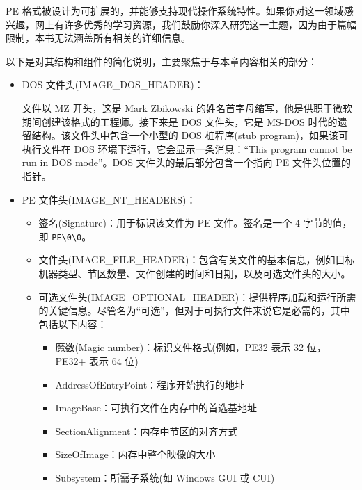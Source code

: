PE 格式被设计为可扩展的，并能够支持现代操作系统特性。如果你对这一领域感兴趣，网上有许多优秀的学习资源，我们鼓励你深入研究这一主题，因为由于篇幅限制，本书无法涵盖所有相关的详细信息。

以下是对其结构和组件的简化说明，主要聚焦于与本章内容相关的部分：

\begin{itemize}
\item 
DOS 文件头(IMAGE\_DOS\_HEADER)：

文件以 MZ 开头，这是 Mark Zbikowski 的姓名首字母缩写，他是供职于微软期间创建该格式的工程师。接下来是 DOS 文件头，它是 MS-DOS 时代的遗留结构。该文件头中包含一个小型的 DOS 桩程序(stub program)，如果该可执行文件在 DOS 环境下运行，它会显示一条消息：“This program cannot be run in DOS mode”。DOS 文件头的最后部分包含一个指向 PE 文件头位置的指针。

\item 
PE 文件头(IMAGE\_NT\_HEADERS)：

\begin{itemize}
\item 
签名(Signature)：用于标识该文件为 PE 文件。签名是一个 4 字节的值，即 \verb|PE\0\0|。

\item 
文件头(IMAGE\_FILE\_HEADER)：包含有关文件的基本信息，例如目标机器类型、节区数量、文件创建的时间和日期，以及可选文件头的大小。

\item 
可选文件头(IMAGE\_OPTIONAL\_HEADER)：提供程序加载和运行所需的关键信息。尽管名为“可选”，但对于可执行文件来说它是必需的，其中包括以下内容：

\begin{itemize}
\item 
魔数(Magic number)：标识文件格式(例如，PE32 表示 32 位，PE32+ 表示 64 位)

\item 
AddressOfEntryPoint：程序开始执行的地址

\item 
ImageBase：可执行文件在内存中的首选基地址

\item 
SectionAlignment：内存中节区的对齐方式

\item 
SizeOfImage：内存中整个映像的大小

\item 
Subsystem：所需子系统(如 Windows GUI 或 CUI)
\end{itemize}

\end{itemize}


\end{itemize}
